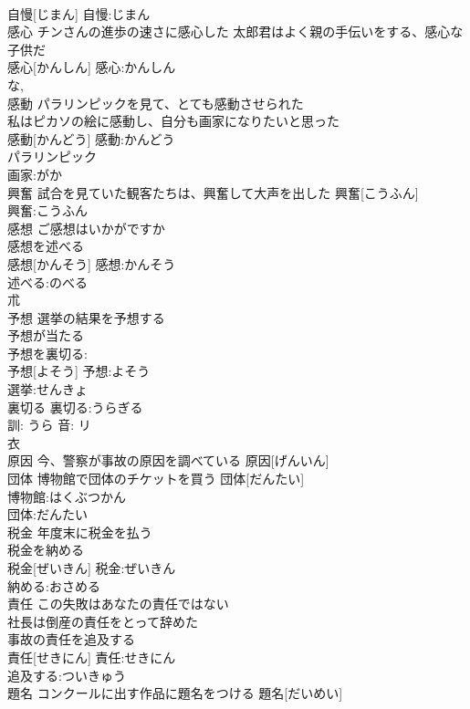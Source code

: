 \documentclass[8pt]{extreport}
\begin{document}
\begin{CJK}{UTF8}{min}
\\	自慢[じまん]			自慢:じまん
\\	感心	チンさんの進歩の速さに感心した 太郎君はよく親の手伝いをする、感心な子供だ 
\\	感心[かんしん]			感心:かんしん
\\	な, 
\\	感動	パラリンピックを見て、とても感動させられた 
\\	私はピカソの絵に感動し、自分も画家になりたいと思った 
\\	感動[かんどう]			感動:かんどう
\\	パラリンピック
\\	画家:がか
\\	興奮	試合を見ていた観客たちは、興奮して大声を出した	興奮[こうふん]	
\\	興奮:こうふん
\\	感想	ご感想はいかがですか 
\\	感想を述べる 
\\	感想[かんそう]			感想:かんそう
\\	述べる:のべる
\\	朮 
\\	予想	選挙の結果を予想する 
\\	予想が当たる 
\\	予想を裏切る: 
\\	予想[よそう]			予想:よそう
\\	選挙:せんきょ
\\	裏切る 裏切る:うらぎる
\\	訓: うら 音: リ 
\\	衣 
\\	原因	今、警察が事故の原因を調べている	原因[げんいん]	
\\	団体	博物館で団体のチケットを買う	団体[だんたい]	
\\	博物館:はくぶつかん
\\	団体:だんたい
\\	税金	年度末に税金を払う 
\\	税金を納める 
\\	税金[ぜいきん]			税金:ぜいきん
\\	納める:おさめる
\\	責任	この失敗はあなたの責任ではない 
\\	社長は倒産の責任をとって辞めた 
\\	事故の責任を追及する 
\\	責任[せきにん]			責任:せきにん
\\	追及する:ついきゅう
\\	題名	コンクールに出す作品に題名をつける	題名[だいめい]	

\end{CJK}
\end{document}
